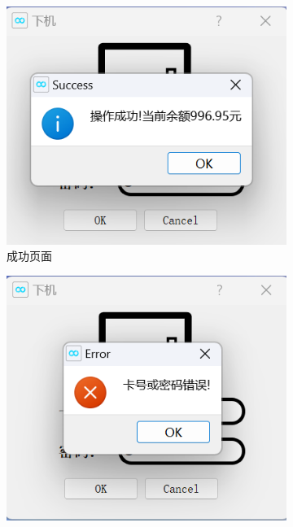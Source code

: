 \documentclass{article}
\begin{document}
    \begin{figure}[htbp]
        \centering
        \begin{subfigure}{0.24\linewidth}
            \centering
            \includegraphics[width=\linewidth]{figure/settle_success.png}
            \caption{成功页面}
            \label{settle_success}
        \end{subfigure}
        \centering
        \begin{subfigure}{0.24\linewidth}
            \centering
            \includegraphics[width=\linewidth]{figure/settle_id_password_error.png}

\end{subfigure}
\end{figure}
\end{document}
